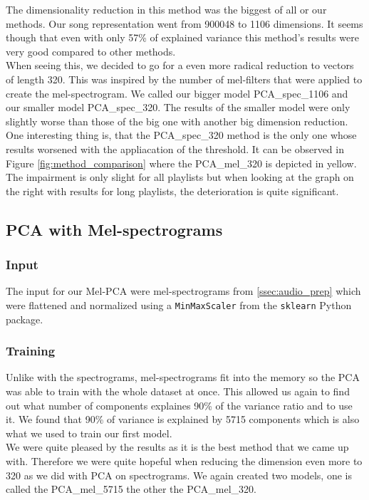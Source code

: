 The dimensionality reduction in this method was the biggest of all or our methods. Our song representation went from 900048 to 1106 dimensions. It seems though that even with only 57\% of explained variance this method's results were very good compared to other methods. \\
When seeing this, we decided to go for a even more radical reduction to vectors of length 320. This was inspired by the number of mel-filters that were applied to create the mel-spectrogram. We called our bigger model PCA\_spec\_1106 and our smaller model PCA\_spec\_320.  The results of the smaller model were only slightly worse than those of the big one with another big dimension reduction. One interesting thing is, that the PCA\_spec\_320 method is the only one whose results worsened with the appliacation of the threshold. It can be observed in Figure \ref{fig:method_comparison} where the PCA\_mel\_320 is depicted in yellow. The impairment is only slight for all playlists but when looking at the graph on the right with results for long playlists, the deterioration is quite significant. \\

\subsection{PCA with Mel-spectrograms}
\subsubsection{Input}
The input for our Mel-PCA were mel-spectrograms from \ref{ssec:audio_prep} which were flattened and normalized using a \texttt{MinMaxScaler} from the \texttt{sklearn} Python package.

\subsubsection{Training}
Unlike with the spectrograms, mel-spectrograms fit into the memory so the PCA was able to train with the whole dataset at once. This allowed us again to find out what number of components explaines 90\% of the variance ratio and to use it. We found that 90\% of variance is explained by 5715 components which is also what we used to train our first model. \\
We were quite pleased by the results as it is the best method that we came up with. Therefore we were quite hopeful when reducing the dimension even more to 320 as we did with PCA on spectrograms. We again created two models, one is called the PCA\_mel\_5715 the other the PCA\_mel\_320. 

